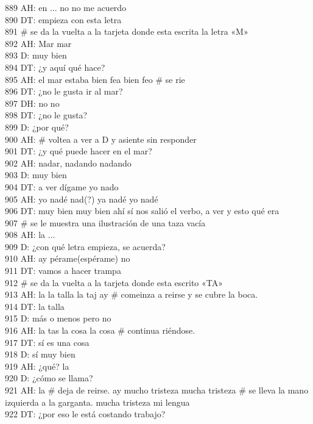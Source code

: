 889 AH: en ... no no me acuerdo\\
890 DT: empieza con esta letra\\
891 # se da la vuelta a la tarjeta donde esta escrita la letra «M»\\
892 AH: Mar mar\\
893 D: muy bien\\
894 DT: ¿y aquí qué hace?\\
895 AH: el mar estaba bien fea bien feo # se rie\\
896 DT: ¿no le gusta ir al mar?\\
897 DH: no no\\
898 DT: ¿no le gusta?\\
899 D: ¿por qué?\\
900 AH: # voltea a ver a D y asiente sin responder\\
901 DT: ¿y qué puede hacer en el mar?\\
902 AH: nadar, nadando nadando\\
903 D: muy bien\\
904 DT: a ver dígame yo nado\\
905 AH: yo nadé nad(?) ya nadé yo nadé\\
906 DT: muy bien muy bien ahí sí nos salió el verbo, a ver y esto qué era\\
907 # se le muestra una ilustración de una taza vacía\\
908 AH: la ...\\
909 D: ¿con qué letra empieza, se acuerda?\\
910 AH: ay pérame(espérame) no\\
911 DT: vamos a hacer trampa\\
912 # se da la vuelta a la tarjeta donde esta escrito «TA»\\
913 AH: la la talla la taj ay # comeinza a reirse y se cubre la boca.\\
914 DT: la talla\\
915 D: más o menos pero no\\
916 AH: la tas la cosa la cosa # continua riéndose.\\
917 DT: sí es una cosa\\
918 D: sí muy bien\\
919 AH: ¿qué? la\\
920 D: ¿cómo se llama?\\
921 AH: la # deja de reirse. ay mucho tristeza mucha tristeza # se lleva la mano izquierda a la garganta. mucha tristeza mi lengua\\
922 DT: ¿por eso le está costando trabajo?\\
